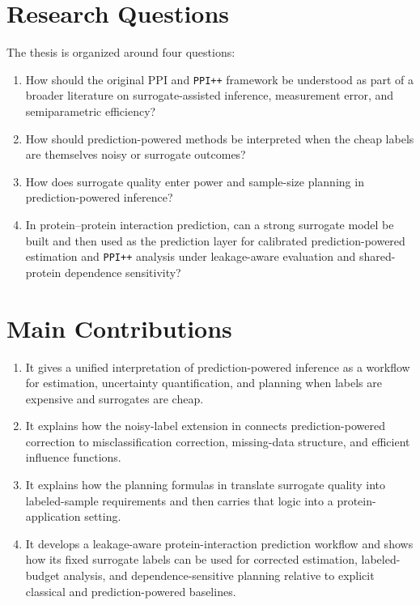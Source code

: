 \section{Research Questions}

The thesis is organized around four questions:
\begin{enumerate}
    \item How should the original PPI and \texttt{PPI++} framework be understood as part of a broader literature on surrogate-assisted inference, measurement error, and semiparametric efficiency?
    \item How should prediction-powered methods be interpreted when the cheap labels are themselves noisy or surrogate outcomes?
    \item How does surrogate quality enter power and sample-size planning in prediction-powered inference?
    \item In protein--protein interaction prediction, can a strong surrogate model be built and then used as the prediction layer for calibrated prediction-powered estimation and \texttt{PPI++} analysis under leakage-aware evaluation and shared-protein dependence sensitivity?
\end{enumerate}

\section{Main Contributions}

\begin{enumerate}
    \item It gives a unified interpretation of prediction-powered inference as a workflow for estimation, uncertainty quantification, and planning when labels are expensive and surrogates are cheap.
    \item It explains how the noisy-label extension in \textcite{llmjudge_eif} connects prediction-powered correction to misclassification correction, missing-data structure, and efficient influence functions.
    \item It explains how the planning formulas in \textcite{ppi_power} translate surrogate quality into labeled-sample requirements and then carries that logic into a protein-application setting.
    \item It develops a leakage-aware protein-interaction prediction workflow and shows how its fixed surrogate labels can be used for corrected estimation, labeled-budget analysis, and dependence-sensitive planning relative to explicit classical and prediction-powered baselines.
\end{enumerate}

